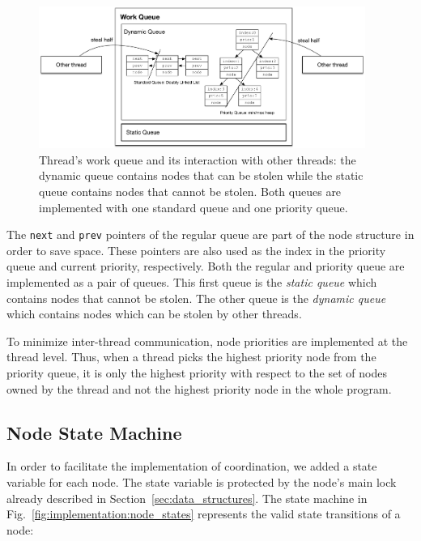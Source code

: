 \begin{figure}[t]
\centering
\includegraphics[width=0.95\textwidth]{figures/implementation/work_queue.pdf}
\caption{Thread's work queue and its interaction with other threads: the dynamic queue contains nodes that can be
   stolen while the static queue contains nodes that cannot be stolen. Both
   queues are implemented with one standard queue and one priority queue.}
\label{fig:implementation:work_queue}
\end{figure}

The \texttt{next} and \texttt{prev} pointers of the regular queue are part of
the node structure in order to save space. These pointers are also used as the
index in the priority queue and current priority, respectively. Both the regular
and priority queue are implemented as a pair of queues.  This first queue is the
\emph{static queue} which contains nodes that cannot be stolen.  The other queue
is the \emph{dynamic queue} which contains nodes which can be stolen by other
threads.

To minimize inter-thread communication, node priorities are implemented at the
thread level. Thus, when a thread picks the highest priority node from the
priority queue, it is only the highest priority with respect to the set of nodes
owned by the thread and not the highest priority node in the whole program.  

\subsection{Node State Machine}\label{sec:node_state_machine}

In order to facilitate the implementation of coordination, we added a state
variable for each node. The state variable is protected by the node's main lock
already described in Section~\ref{sec:data_structures}. The state
machine in Fig.~\ref{fig:implementation:node_states} represents the valid state
transitions of a node:

